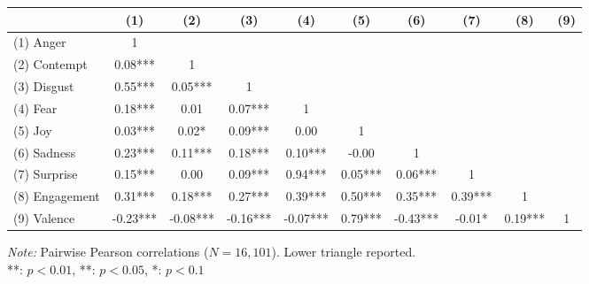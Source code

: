 \begingroup
\centering
\scriptsize
\setlength{\tabcolsep}{3pt}
\begin{tabular}{lccccccccc}
\toprule
  & (1) & (2) & (3) & (4) & (5) & (6) & (7) & (8) & (9) \\
\midrule
  (1) Anger & 1 &  &  &  &  &  &  &  &  \\
  (2) Contempt & 0.08*** & 1 &  &  &  &  &  &  &  \\
  (3) Disgust & 0.55*** & 0.05*** & 1 &  &  &  &  &  &  \\
  (4) Fear & 0.18*** & 0.01 & 0.07*** & 1 &  &  &  &  &  \\
  (5) Joy & 0.03*** & 0.02* & 0.09*** & 0.00 & 1 &  &  &  &  \\
  (6) Sadness & 0.23*** & 0.11*** & 0.18*** & 0.10*** & -0.00 & 1 &  &  &  \\
  (7) Surprise & 0.15*** & 0.00 & 0.09*** & 0.94*** & 0.05*** & 0.06*** & 1 &  &  \\
  (8) Engagement & 0.31*** & 0.18*** & 0.27*** & 0.39*** & 0.50*** & 0.35*** & 0.39*** & 1 &  \\
  (9) Valence & -0.23*** & -0.08*** & -0.16*** & -0.07*** & 0.79*** & -0.43*** & -0.01* & 0.19*** & 1 \\
\bottomrule
\end{tabular}
\par
\vspace{2pt}
{\footnotesize \textit{Note:} Pairwise Pearson correlations ($N = 16{,}101$). Lower triangle reported.}\\
{\footnotesize ***: $p<0.01$, **: $p<0.05$, *: $p<0.1$}
\endgroup
